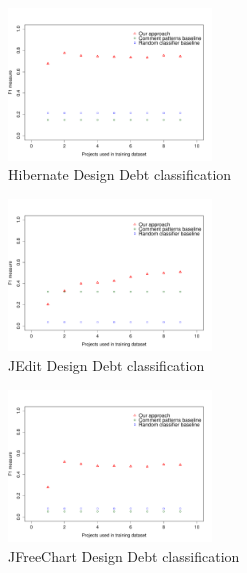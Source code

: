\clearpage

\begin{figure}[thb!]
  \centering
  \includegraphics[width=0.48\textwidth]{figures/appendix/iteration_details/design_hibernate.pdf}
  \caption{Hibernate Design Debt classification}
  \label{fig:design_hibernate}
\end{figure}

\begin{figure}[thb!]
  \centering
  \includegraphics[width=0.48\textwidth]{figures/appendix/iteration_details/design_jedit.pdf}
  \vspace{-3mm}
  \caption{JEdit Design Debt classification}
  \label{fig:design_jedit}
\end{figure}

\begin{figure}[thb!]
  \centering
  \includegraphics[width=0.48\textwidth]{figures/appendix/iteration_details/design_jfreechart.pdf}
  \vspace{-3mm}
  \caption{JFreeChart Design Debt classification}
  \label{fig:design_jfreechart}
\end{figure}

